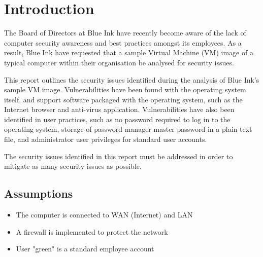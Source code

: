 \section{Introduction}

The Board of Directors at Blue Ink have recently become aware of the lack of computer security awareness and best practices amongst its employees. As a result, Blue Ink have requested that a sample Virtual Machine (VM) image of a typical computer within their organisation be analysed for security issues.

This report outlines the security issues identified during the analysis of Blue Ink's sample VM image. Vulnerabilities have been found with the operating system itself, and support software packaged with the operating system, such as the Internet browser and anti-virus application. Vulnerabilities have also been identified in user practices, such as no password required to log in to the operating system, storage of password manager master password in a plain-text file, and administrator user privileges for standard user accounts.

The security issues identified in this report must be addressed in order to mitigate as many security issues as possible.

\subsection{Assumptions}

\begin{itemize}
\item The computer is connected to WAN (Internet) and LAN
\item A firewall is implemented to protect the network
\item User "green" is a standard employee account
\end{itemize}
